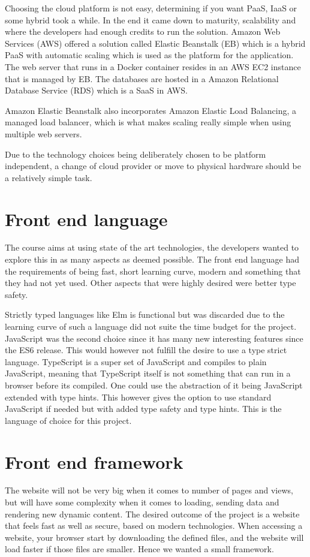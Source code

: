 \documentclass[12pt,a4paper]{report}
\begin{document}
Choosing the cloud platform is not easy, determining if you want PaaS, IaaS or some hybrid took a while. In the end it came down to maturity, scalability and where the developers had enough credits to run the solution. Amazon Web Services (AWS) offered a solution called Elastic Beanstalk (EB)\cite{what-is-eb} which is a hybrid PaaS with automatic scaling which is used as the platform for the application. The web server that runs in a Docker container resides in an AWS EC2 instance that is managed by EB. The databases are hosted in a Amazon Relational Database Service (RDS) which is a SaaS in AWS.

Amazon Elastic Beanstalk also incorporates Amazon Elastic Load Balancing, a managed load balancer, which is what makes scaling really simple when using multiple web servers.

Due to the technology choices being deliberately chosen to be platform independent, a change of cloud provider or move to physical hardware should be a relatively simple task.

\section{Front end language}
The course aims at using state of the art technologies, the developers wanted to explore this in as many aspects as deemed possible. The front end language had the requirements of being fast, short learning curve, modern and something that they had not yet used. Other aspects that were highly desired were better type safety.

Strictly typed languages like Elm is functional but was discarded due to the learning curve of such a language did not suite the time budget for the project.
JavaScript was the second choice since it has many new interesting features since the ES6 release. This would however not fulfill the desire to use a type strict language.
TypeScript\cite{typescript} is a super set of JavaScript and compiles to plain JavaScript, meaning that TypeScript itself is not something that can run in a browser before its compiled. One could use the abstraction of it being JavaScript extended with type hints. This however gives the option to use standard JavaScript if needed but with added type safety and type hints. This is the language of choice for this project.

\section{Front end framework}
The website will not be very big when it comes to number of pages and views, but will have some complexity when it comes to loading, sending data and rendering new dynamic content.
The desired outcome of the project is a website that feels fast as well as secure, based on modern technologies. When accessing a website, your browser start by downloading the defined files, and the website will load faster if those files are smaller. Hence we wanted a small framework.
\end{document}
